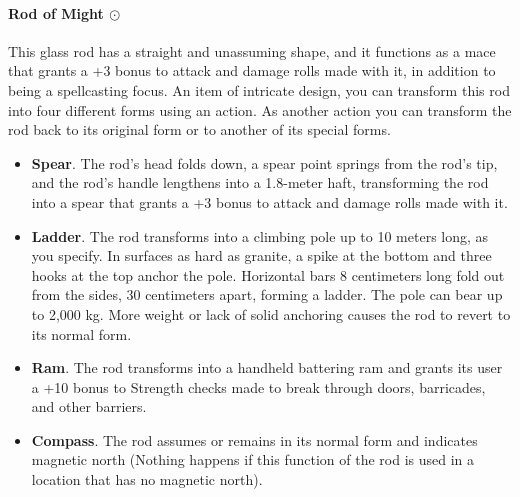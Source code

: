     \paragraph{Rod of Might $\odot$} %
        This glass rod has a straight and unassuming shape, and it functions as a mace that grants a +3 bonus to attack and damage rolls made with it, in addition to being a spellcasting focus.
        An item of intricate design, you can transform this rod into four different forms using an action.
        As another action you can transform the rod back to its original form or to another of its special forms.
        \begin{itemize}
            \item \textbf{Spear}.
            The rod's head folds down, a spear point springs from the rod's tip, and the rod's handle lengthens into a 1.8-meter haft, transforming the rod into a spear that grants a +3 bonus to attack and damage rolls made with it.
            \item \textbf{Ladder}.
            The rod transforms into a climbing pole up to 10 meters long, as you specify.
            In surfaces as hard as granite, a spike at the bottom and three hooks at the top anchor the pole.
            Horizontal bars 8 centimeters long fold out from the sides, 30 centimeters apart, forming a ladder.
            The pole can bear up to 2,000 kg.
            More weight or lack of solid anchoring causes the rod to revert to its normal form.
            \item \textbf{Ram}.
            The rod transforms into a handheld battering ram and grants its user a +10 bonus to Strength checks made to break through doors, barricades, and other barriers.
            \item \textbf{Compass}.
            The rod assumes or remains in its normal form and indicates magnetic north (Nothing happens if this function of the rod is used in a location that has no magnetic north).
        \end{itemize}

